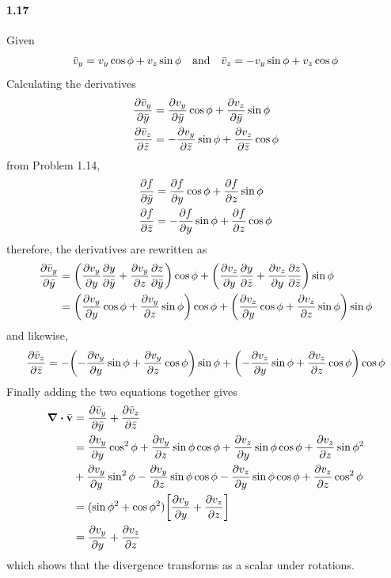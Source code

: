\documentclass[../main.tex]{subfiles}
\begin{document}
\paragraph{1.17}
Given
\begin{align*}
    \bar{v}_y = v_y \cos\phi + v_z \sin\phi \qand \bar{v}_z = -v_y \sin\phi + v_z \cos\phi
\end{align*}
Calculating the derivatives
\begin{align*}
    \pdv{\bar{v}_y}{\bar{y}} &= \pdv{v_y}{\bar{y}} \cos\phi + \pdv{v_z}{\bar{y}} \sin\phi \\
    \pdv{\bar{v}_z}{\bar{z}} &= -\pdv{v_y}{\bar{z}} \sin\phi + \pdv{v_z}{\bar{z}} \cos\phi
\end{align*}
from Problem 1.14,
\begin{align*}
    \pdv{f}{\bar{y}} &= \pdv{f}{y} \cos\phi + \pdv{f}{z} \sin\phi \\
    \pdv{f}{\bar{z}} &= -\pdv{f}{y} \sin\phi + \pdv{f}{z} \cos\phi
\end{align*}
therefore, the derivatives are rewritten as
\begin{align*}
    \pdv{\bar{v}_y}{\bar{y}} &=
        \quantity(\pdv{v_y}{y} \pdv{y}{\bar{y}} + \pdv{v_y}{z} \pdv{z}{\bar{y}}) \cos\phi 
        + \quantity(\pdv{v_z}{y} \pdv{y}{\bar{z}} + \pdv{v_z}{y} \pdv{z}{\bar{z}}) \sin\phi \\
    &= \quantity(\pdv{v_y}{y} \cos\phi + \pdv{v_y}{z} \sin\phi) \cos\phi 
        + \quantity(\pdv{v_z}{y} \cos\phi + \pdv{v_z}{z} \sin\phi) \sin\phi
\end{align*}
and likewise,
\begin{align*}
    \pdv{\bar{v}_z}{\bar{z}} &=
        - \quantity(-\pdv{v_y}{y} \sin\phi +\pdv{v_y}{z} \cos\phi) \sin\phi 
        + \quantity(-\pdv{v_z}{y} \sin\phi + \pdv{v_z}{z} \cos\phi) \cos\phi \\
\end{align*}
Finally adding the two equations together gives
\begin{align*}
    \div{\bar{\vb{v}}} &= \pdv{\bar{v}_y}{\bar{y}} + \pdv{\bar{v}_z}{\bar{z}} \\
    &= \pdv{v_y}{y} \cos^2\phi + \pdv{v_y}{z} \sin\phi\cos\phi 
        + \pdv{v_z}{y} \sin\phi\cos\phi + \pdv{v_z}{z} \sin\phi^2 \\
    &+ \pdv{v_y}{y} \sin^2\phi - \pdv{v_y}{z} \sin\phi\cos\phi
        - \pdv{v_z}{y} \sin\phi\cos\phi + \pdv{v_z}{z} \cos^2\phi \\
    &= (\sin\phi^2 + \cos\phi^2)\quantity[\pdv{v_y}{y} + \pdv{v_z}{z}] \\
    &= \pdv{v_y}{y} + \pdv{v_z}{z}
\end{align*}
which shows that the divergence transforms as a scalar under rotations.
\end{document}
